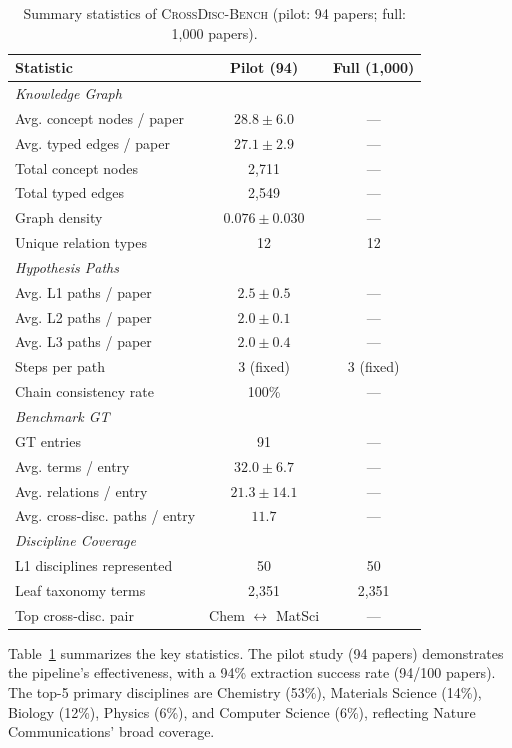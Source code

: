 \documentclass{article}
\newcommand{\ours}{\textsc{CrossDisc-Bench}}
\begin{document}
\begin{table}[t]
\centering
\caption{Summary statistics of \ours{} (pilot: 94 papers; full: 1{,}000 papers).}
\label{tab:dataset_stats}
\small
\begin{tabular}{lcc}
\toprule
\textbf{Statistic} & \textbf{Pilot (94)} & \textbf{Full (1{,}000)} \\
\midrule
\multicolumn{3}{l}{\textit{Knowledge Graph}} \\
Avg. concept nodes / paper & $28.8 \pm 6.0$ & --- \\
Avg. typed edges / paper & $27.1 \pm 2.9$ & --- \\
Total concept nodes & 2{,}711 & --- \\
Total typed edges & 2{,}549 & --- \\
Graph density & $0.076 \pm 0.030$ & --- \\
Unique relation types & 12 & 12 \\
\midrule
\multicolumn{3}{l}{\textit{Hypothesis Paths}} \\
Avg. L1 paths / paper & $2.5 \pm 0.5$ & --- \\
Avg. L2 paths / paper & $2.0 \pm 0.1$ & --- \\
Avg. L3 paths / paper & $2.0 \pm 0.4$ & --- \\
Steps per path & 3 (fixed) & 3 (fixed) \\
Chain consistency rate & 100\% & --- \\
\midrule
\multicolumn{3}{l}{\textit{Benchmark GT}} \\
GT entries & 91 & --- \\
Avg. terms / entry & $32.0 \pm 6.7$ & --- \\
Avg. relations / entry & $21.3 \pm 14.1$ & --- \\
Avg. cross-disc. paths / entry & $11.7$ & --- \\
\midrule
\multicolumn{3}{l}{\textit{Discipline Coverage}} \\
L1 disciplines represented & 50 & 50 \\
Leaf taxonomy terms & 2{,}351 & 2{,}351 \\
Top cross-disc. pair & Chem $\leftrightarrow$ MatSci & --- \\
\bottomrule
\end{tabular}
\end{table}

Table~\ref{tab:dataset_stats} summarizes the key statistics.
The pilot study (94 papers) demonstrates the pipeline's effectiveness, with a 94\% extraction success rate (94/100 papers).
The top-5 primary disciplines are Chemistry (53\%), Materials Science (14\%), Biology (12\%), Physics (6\%), and Computer Science (6\%), reflecting Nature Communications' broad coverage.
\end{document}
